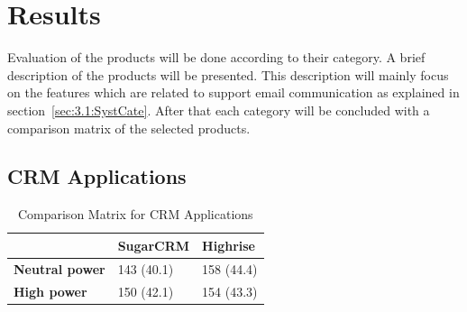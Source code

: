 \section{Results}
\label{sec:3.3:Resul}
Evaluation of the products will be done according to their category. A brief description of the products will be presented. This description will mainly focus on the features which are related to support email communication as explained in section~\ref{sec:3.1:SystCate}. After that each category will be concluded with a comparison matrix of the selected products.

\subsection{CRM Applications}
\label{subsec:3.3.1:CRMAppl}

\begin{table}[!ht]
\begin{center}
	\caption[Comparison Matrix for CRM Applications]{Comparison Matrix for CRM Applications} \label{tab:comp_matr_crm}
    \begin{tabular}{ p{3cm} p{3cm}  p{3cm} }
	\hline
	& \textbf{SugarCRM} & \textbf{Highrise} \\ \hline
	\textbf{Neutral power} & 143 (40.1) & 158 (44.4) \\
	\textbf{High power} & 150 (42.1) & 154 (43.3) \\ \hline
    \end{tabular}
\end{center}
\end{table}

